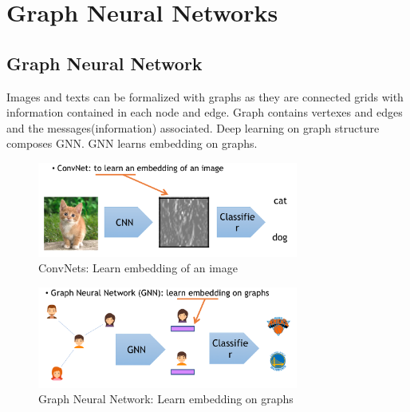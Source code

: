 \chapter{Graph Neural Networks}

\section{Graph Neural Network}
Images and texts can be formalized with graphs as they are connected grids with information contained in each node and edge. Graph contains vertexes and edges and the messages(information) associated. Deep learning on graph structure composes GNN. GNN learns embedding on graphs. 

\begin{figure}[ht]
\begin{center}
  \includegraphics[width=3.38in]{images/Embedding_ConvNet.png}
\end{center}
   \caption{ConvNets: Learn embedding of an image}
\label{fig:CV}
\end{figure}

\begin{figure}[ht]
\begin{center}
  \includegraphics[width=3.38in]{images/Embedding_Graph.png}
\end{center}
   \caption{Graph Neural Network: Learn embedding on graphs}
\label{fig:CV}
\end{figure}

